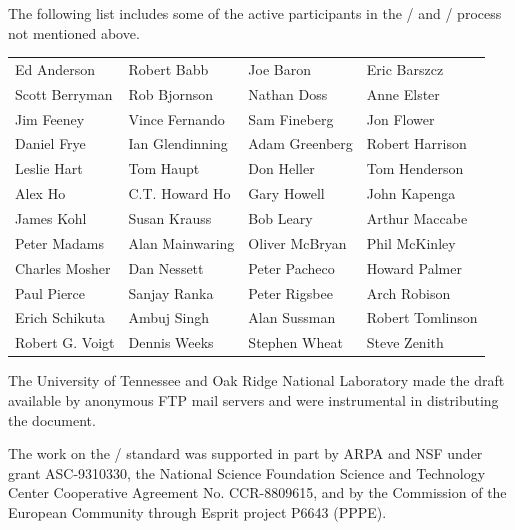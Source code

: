 The following list includes some of the active participants in
the \MPIIDOTO/ and \MPIIDOTI/ process not mentioned above.

\begin{center}
\begin{tabular}{llll}
Ed Anderson	&
Robert Babb     &
Joe Baron	&
Eric Barszcz	\\
Scott Berryman  &
Rob Bjornson	&
Nathan Doss     &
Anne Elster	\\
Jim Feeney	&
Vince Fernando	&
Sam Fineberg		&
Jon Flower		\\
Daniel Frye		&
Ian Glendinning	&
Adam Greenberg			&
Robert Harrison		\\
Leslie Hart		&
Tom Haupt		&
Don Heller			&
Tom Henderson		\\
Alex Ho			&
C.T. Howard Ho		&
Gary Howell             &
John Kapenga       	\\
James Kohl		&
Susan Krauss		&
Bob Leary	  		&
Arthur Maccabe   	\\
Peter Madams		&
Alan Mainwaring		&
Oliver McBryan	&
Phil McKinley	\\
Charles Mosher		&
Dan Nessett	&
Peter Pacheco	&
Howard Palmer		\\
Paul Pierce	&
Sanjay Ranka		&
Peter Rigsbee	&
Arch Robison	\\
Erich Schikuta	&
Ambuj Singh	&
Alan Sussman		&
Robert Tomlinson	\\
Robert G. Voigt		&
Dennis Weeks	&
Stephen Wheat	&
Steve Zenith
\end{tabular}
\end{center}


The University of Tennessee and Oak Ridge National Laboratory
made the draft available by anonymous FTP 
mail servers and were instrumental in distributing 
the document.
 
The work on the \MPII/ standard was supported in part by ARPA and NSF
under grant ASC-9310330,  
the National Science Foundation Science and
Technology Center Cooperative Agreement No. CCR-8809615,
and by the Commission of the European Community through Esprit project
P6643 (PPPE).

